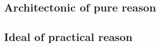 \begin{appendices}

		\chapter{Architectonic of pure reason}\label{ch:A_chapter}
	
		\section{Ideal of practical reason}\label{sec:A_section}
			
			\kant[50-51]

\end{appendices}